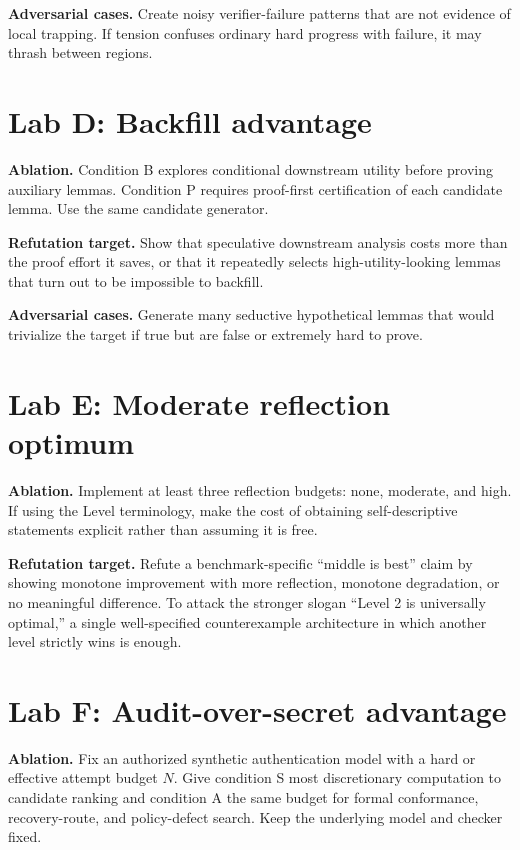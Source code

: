 \documentclass[11pt,openany]{book}
\theoremstyle{definition}
\theoremstyle{remark}
\begin{document}
\textbf{Adversarial cases.} Create noisy verifier-failure patterns that are not evidence of local trapping. If tension confuses ordinary hard progress with failure, it may thrash between regions.

\section{Lab D: Backfill advantage}
\textbf{Ablation.} Condition B explores conditional downstream utility before proving auxiliary lemmas. Condition P requires proof-first certification of each candidate lemma. Use the same candidate generator.

\textbf{Refutation target.} Show that speculative downstream analysis costs more than the proof effort it saves, or that it repeatedly selects high-utility-looking lemmas that turn out to be impossible to backfill.

\textbf{Adversarial cases.} Generate many seductive hypothetical lemmas that would trivialize the target if true but are false or extremely hard to prove.

\section{Lab E: Moderate reflection optimum}
\textbf{Ablation.} Implement at least three reflection budgets: none, moderate, and high. If using the Level terminology, make the cost of obtaining self-descriptive statements explicit rather than assuming it is free.

\textbf{Refutation target.} Refute a benchmark-specific ``middle is best'' claim by showing monotone improvement with more reflection, monotone degradation, or no meaningful difference. To attack the stronger slogan ``Level 2 is universally optimal,'' a single well-specified counterexample architecture in which another level strictly wins is enough.



\section{Lab F: Audit-over-secret advantage}
\textbf{Ablation.} Fix an authorized synthetic authentication model with a hard or effective attempt budget $N$. Give condition S most discretionary computation to candidate ranking and condition A the same budget for formal conformance, recovery-route, and policy-defect search. Keep the underlying model and checker fixed.
\end{document}
